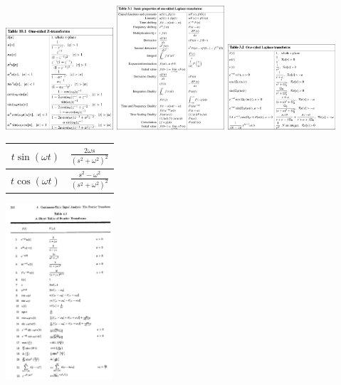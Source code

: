 \documentclass[12pt,landscape,letterpaper]{article}
\begin{document}
\begin{multicols*}{3}
	\includegraphics[width=0.3\textwidth]{zXform-pairs}
	\includegraphics[width=0.3\textwidth]{laplace-properties}
	\includegraphics[width=0.3\textwidth]{laplace-pairs}
	\begin{tabular}{|c|c|}
		\hline
		$t\sin(\omega t)$ & $\frac{2\omega s}{(s^2 + \omega ^2)^2}$\\
		\hline
		$t\cos(\omega t)$ & $\frac{s^2 - \omega ^2}{(s^2 + \omega ^2)^2}$\\
		\hline
	\end{tabular}
    \includegraphics[width=0.3\textwidth]{fourierXform-pairs2}
\end{multicols*}
\newpage
\end{document}
